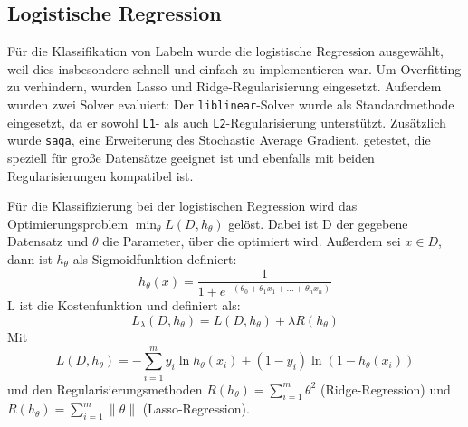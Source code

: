 \subsection{Logistische Regression}

Für die Klassifikation von Labeln wurde die logistische Regression ausgewählt, weil dies insbesondere schnell und einfach zu implementieren war. Um Overfitting zu verhindern, wurden Lasso und Ridge-Regularisierung eingesetzt. Außerdem wurden zwei Solver evaluiert: Der \texttt{liblinear}-Solver wurde als Standardmethode eingesetzt, da er sowohl \texttt{L1}- als auch \texttt{L2}-Regularisierung unterstützt. Zusätzlich wurde \texttt{saga}, eine Erweiterung des Stochastic Average Gradient, getestet, die speziell für große Datensätze geeignet ist und ebenfalls mit beiden Regularisierungen kompatibel ist.

Für die Klassifizierung bei der logistischen Regression wird das Optimierungsproblem $\min_\theta L(D,h_\theta)$ gelöst. Dabei ist D der gegebene Datensatz und $\theta$ die Parameter, über die optimiert wird. Außerdem sei $x \in D$, dann ist $h_\theta$ als Sigmoidfunktion definiert:
\begin{equation*}
    h_\theta(x) = \frac{1}{1 + e^{-(\theta_0 + \theta_1 x_1 + \dots + \theta_n x_n)}}
\end{equation*}
L ist die Kostenfunktion und definiert als:
\begin{equation*}
    L_\lambda(D, h_\theta)=L(D,h_\theta)+\lambda R(h_\theta) 
\end{equation*}
Mit
\begin{equation*}
     L(D,h_\theta)=- \sum_{i=1}^{m}  y_i \ln h_\theta(x_i) + (1 - y_i) \ln (1 - h_\theta(x_i))
\end{equation*}
und den Regularisierungsmethoden $R(h_\theta)=\sum_{i=1}^m\theta^2$ (Ridge-Regression) und $ R(h_\theta)=\sum_{i=1}^m\|\theta\|$ (Lasso-Regression).